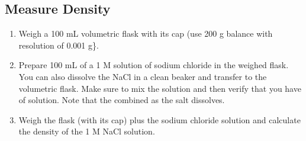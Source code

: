 \documentclass[letterpaper,10pt,english]{sphinxmanual}
\begin{document}
\subsection{Measure Density}
\label{\detokenize{Laboratory_Measurements/Laboratory_Measurements:measure-density}}\begin{enumerate}
\item {} 
Weigh a 100 mL volumetric flask with its cap (use 200 g balance with resolution of 0.001 g\}.

\item {} 
Prepare 100 mL of a 1 M solution of sodium chloride in the weighed flask. You can also dissolve the NaCl in a clean beaker and transfer to the volumetric flask.  Make sure to mix the solution and then verify that you have  of solution. Note that the combined  as the salt dissolves.

\item {} 
Weigh the flask (with its cap) plus the sodium chloride solution and calculate the density of the 1 M NaCl solution.

\end{enumerate}

%
\begin{sphinxVerbatim}[commandchars=\\\{\}]
 
   
     
   
   
  
  
   
 
\end{sphinxVerbatim}
\end{document}
